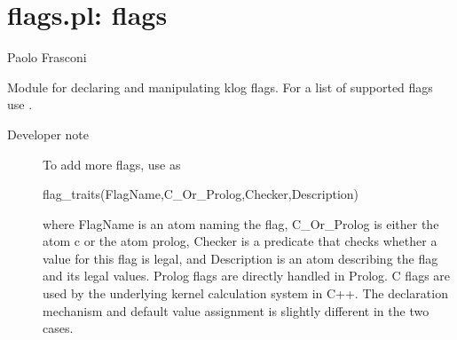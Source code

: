 


\section{flags.pl: flags}

\label{sec:flags}

\begin{tags}
Paolo Frasconi
\end{tags}

Module for declaring and manipulating klog flags. For a list of
supported flags use .

\begin{description}
    \item[Developer note] To add more flags, use  as

\begin{code}
flag_traits(FlagName,C_Or_Prolog,Checker,Description)
\end{code}

where FlagName is an atom naming the flag, C_Or_Prolog is either the
atom c or the atom prolog, Checker is a predicate that checks
whether a value for this flag is legal, and Description is an atom
describing the flag and its legal values. Prolog flags are directly
handled in Prolog. C flags are used by the underlying kernel
calculation system in C++. The declaration mechanism and default
value assignment is slightly different in the two cases.
\end{description}

\vspace{0.7cm}

